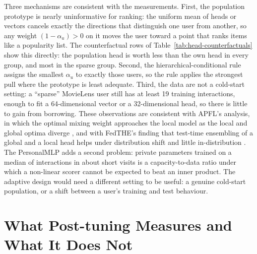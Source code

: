 Three mechanisms are consistent with the measurements. First, the population prototype is
nearly uninformative for ranking: the uniform mean of \DsUsers{} heads or vectors cancels
exactly the directions that distinguish one user from another, so any weight $(1-\alpha_u)>0$
on it moves the user toward a point that ranks items like a popularity list. The counterfactual
rows of Table~\ref{tab:head-counterfactuals} show this directly: the population head is worth
less than the own head in every group, and most in the sparse group. Second, the
hierarchical-conditional rule assigns the smallest $\alpha_u$ to exactly those users, so the
rule applies the strongest pull where the prototype is least adequate. Third, the data are not a
cold-start setting: a ``sparse'' MovieLens user still has at least 19 training interactions, enough
to fit a 64-dimensional vector or a 32-dimensional head, so there is little to gain from
borrowing. These observations are consistent with APFL's analysis, in which the optimal mixing
weight approaches the local model as the local and global optima diverge
\cite{deng2020apfl}, and with FedTHE's finding that test-time ensembling of a global and a local
head helps under distribution shift and little in-distribution \cite{jiang2023fedthe}. The
PersonalMLP adds a second problem: \ParamsPersonalMlp{} private parameters trained on a median
of \DsMedianRatings{} interactions in about \ExpectedParticipations{} short visits is a
capacity-to-data ratio under which a non-linear scorer cannot be expected to beat an inner
product. The adaptive design would need a different setting to be useful: a genuine cold-start
population, or a shift between a user's training and test behaviour.

\section{What Post-tuning Measures and What It Does Not}
\label{sec:disc-posttune}

